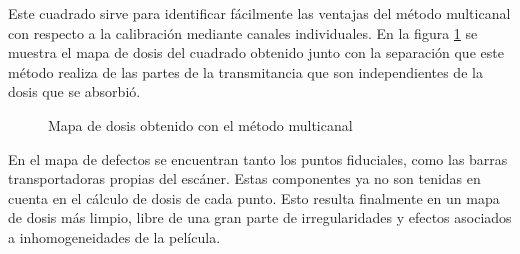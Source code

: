 Este cuadrado sirve para identificar fácilmente las ventajas del método multicanal con respecto a la calibración mediante canales individuales. En la figura \ref{fig:MapaCuadrado} se muestra el mapa de dosis del cuadrado obtenido junto con la separación que este método realiza de las partes de la transmitancia que son independientes de la dosis que se absorbió.\\
\begin{figure}[H]
	\centering
	\hfill
	\caption{Mapa de dosis obtenido con el método multicanal}
	\label{fig:MapaCuadrado}
\end{figure}

En el mapa de defectos se encuentran tanto los puntos fiduciales, como las barras transportadoras propias del escáner. Estas componentes ya no son tenidas en cuenta en el cálculo de dosis de cada punto. Esto resulta finalmente en un mapa de dosis más limpio, libre de una gran parte de irregularidades y efectos asociados a inhomogeneidades de la película.\\

